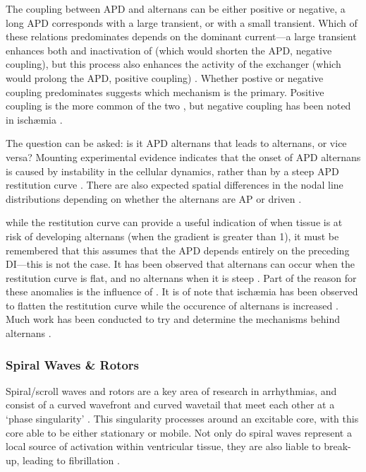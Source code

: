 \documentclass[../thesis-main.tex]{subfiles}
\begin{document}
 The coupling between APD and \ca{} alternans can be either positive or negative, \idest{} a long APD corresponds with a large \cai{} transient, or with a small \cai{} transient. Which of these relations predominates depends on the dominant current---a large \cai{} transient enhances both \iks{} and inactivation of \ica{} (which would shorten the APD, \idest{} negative coupling), but this process also enhances the activity of the exchanger \inaca{} (which would prolong the APD, \idest{} positive coupling) \citep{Shiferaw2005}. Whether postive or negative coupling predominates suggests which mechanism is the primary. Positive coupling is the more common of the two \citep{Laurita2008}, but negative coupling has been noted in isch\ae{}mia \citep{Lee1988}.
 
 The question can be asked: is it APD alternans that leads to \ca{} alternans, or vice versa? Mounting experimental evidence indicates that the onset of APD alternans is caused by instability in the cellular \cai{} dynamics, rather than by a steep APD restitution curve \citep{Goldhaber2005, Pruvot2004}. There are also expected spatial differences in the nodal line distributions depending on whether the alternans are AP or \ca{} driven \citep{Weiss2006}.
 
 while the restitution curve can provide a useful indication of when tissue is at risk of developing alternans (when the gradient is greater than 1), it must be remembered that this assumes that the APD depends entirely on the preceding DI---this is not the case. It has been observed that alternans can occur when the restitution curve is flat, and no alternans when it is steep \citep{Shiferaw2005}. Part of the reason for these anomalies is the influence of \cai{}. It is of note that isch\ae{}mia has been observed to flatten the restitution curve \citep{Taggart1996} while the occurence of alternans is increased \citep{Qian2001}. Much work has been conducted to try and determine the mechanisms behind \ca{} alternans \citep{Shiferaw2003, Weiss2006}.
 
 \subsubsection{Spiral Waves \& Rotors}
 \label{subsubsec:spiralWaves-rotors}
 Spiral/scroll waves and rotors are a key area of research in arrhythmias, and consist of a curved wavefront and curved wavetail that meet each other at a `phase singularity' \citep{Fitzhugh1960, Fitzhugh1961, Gray1998}. This singularity processes around an excitable core, with this core able to be either stationary or mobile. Not only do spiral waves represent a local source of activation within ventricular tissue, they are also liable to break-up, leading to fibrillation \citep{Riccio1999}.
 
\end{document}
